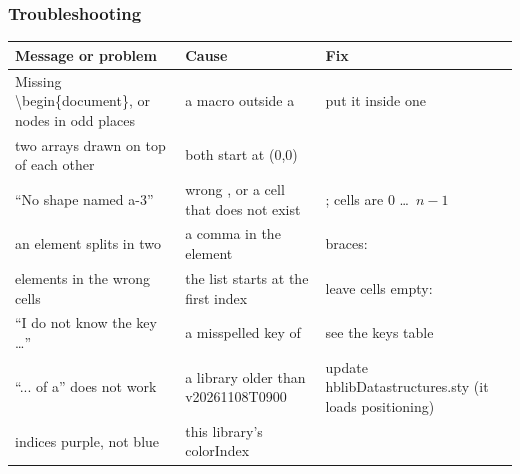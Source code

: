 \documentclass[aspectratio=169,10pt,compress]{beamer}
\begin{document}




\begin{frame}[t,fragile] \frametitle{Troubleshooting}

\begin{table}
		\scriptsize
		\begin{tabular}{@{}L{0.36\textwidth}L{0.28\textwidth}L{0.28\textwidth}@{}}
			\toprule
			\textbf{Message or problem} & \textbf{Cause} & \textbf{Fix} \\
			\midrule
			Missing \textbackslash begin\{document\}, or nodes in odd places & a macro outside a  & put it inside one \\
			two arrays drawn on top of each other & both start at (0,0) &  \\
			``No shape named a-3'' & wrong , or a cell that does not exist & ; cells are 0 \dots\ $n-1$ \\
			an element splits in two & a comma in the element & braces:  \\
			 elements in the wrong cells & the list starts at the first index & leave cells empty:  \\
			``I do not know the key \dots'' & a misspelled key of  & see the keys table \\
			``... of a'' does not work & a library older than v20261108T0900 & update hblibDatastructures.sty (it loads positioning) \\
			indices purple, not blue & this library's colorIndex &  \\
			\bottomrule
		\end{tabular}
\end{table}%
\end{frame}
\end{document}
